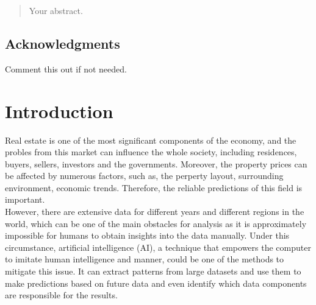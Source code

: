\documentclass[12pt,twoside]{report}
\date{June 2022}
\begin{document}



\clearpage{\pagestyle{empty}\cleardoublepage}
\setcounter{page}{1}
\pagestyle{plain}
\graphicspath{ {./figures/} }

\begin{abstract}
Your abstract.
\end{abstract}

\cleardoublepage
\section*{Acknowledgments}
Comment this out if not needed.

\clearpage{\pagestyle{empty}\cleardoublepage}

\tableofcontents 


\clearpage{\pagestyle{empty}\cleardoublepage}
\setcounter{page}{1}
\fancyhead[LE,RO]{\slshape \rightmark}
\fancyhead[LO,RE]{\slshape \leftmark}

\chapter{Introduction}

Real estate is one of the most significant components of the economy, and the probles from this market can influence the whole society, including residences, buyers, sellers, investors and the governments.  Moreover, the property prices can be affected by numerous factors, such as, the perperty layout, surrounding environment, economic trends. Therefore, the reliable predictions of this field is important.  
\\

However, there are extensive data for different years and different regions in the world, which can be one of the main obstacles for analysis as it is approximately impossible for humans to obtain insights into the data manually. Under this circumstance, artificial intelligence (AI), a technique that empowers the computer to imitate human intelligence and manner,  could be one of the methods to mitigate this issue. It can extract patterns from large datasets and use them to make predictions based on future data and even identify which data components are responsible for the results.
\\
\end{document}
